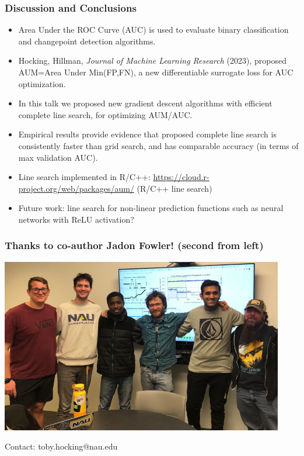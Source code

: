 \documentclass[t]{beamer}
\begin{document}
\begin{frame}
  \frametitle{Discussion and Conclusions}
  \begin{itemize}
  \item Area Under the ROC Curve (AUC) is used to evaluate binary
    classification and changepoint detection algorithms.
  \item Hocking, Hillman, \emph{Journal of Machine Learning Research}
    (2023), proposed AUM=Area Under Min(FP,FN), a new
    differentiable surrogate loss for AUC optimization.
  \item In this talk we proposed new gradient descent algorithms with
    efficient complete line search, for optimizing AUM/AUC.
  \item Empirical results provide evidence that proposed complete line
    search is consistently faster than grid search, and has 
    comparable accuracy (in terms of max validation AUC).
  \item Line search implemented in R/C++:
    {\scriptsize
    \url{https://cloud.r-project.org/web/packages/aum/} (R/C++ line search)
    }
  \item Future work: line search for non-linear prediction functions
    such as neural networks with ReLU activation?
  \end{itemize}
\end{frame}

\begin{frame}
  \frametitle{Thanks to co-author Jadon Fowler! (second from left)}

  \includegraphics[height=3in]{2023-02-02-group-meeting}

  Contact: toby.hocking@nau.edu

\end{frame}
\end{document}
